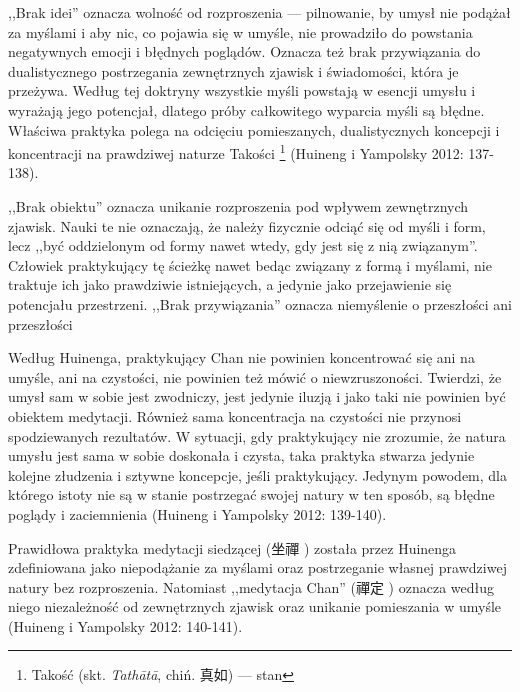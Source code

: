 ,,Brak idei'' oznacza wolność od rozproszenia --- pilnowanie, by umysł nie podążał za myślami i aby nic, co pojawia się w umyśle, nie prowadziło do powstania negatywnych emocji i błędnych poglądów. Oznacza też brak przywiązania do dualistycznego postrzegania zewnętrznych zjawisk i świadomości, która je przeżywa. Według tej doktryny wszystkie myśli powstają w esencji umysłu i wyrażają jego potencjał, dlatego próby całkowitego wyparcia myśli są błędne. Właściwa praktyka polega na odcięciu pomieszanych, dualistycznych koncepcji i koncentracji na prawdziwej naturze Takości%
\footnote{Takość (skt. \textit{Tathātā}, chiń. 真如) --- stan }
(Huineng i Yampolsky 2012: 137-138).

,,Brak obiektu'' oznacza unikanie rozproszenia pod wpływem zewnętrznych zjawisk. Nauki te nie oznaczają, że należy fizycznie odciąć się od myśli i form, lecz ,,być oddzielonym od formy nawet wtedy, gdy jest się z nią związanym''. Człowiek praktykujący tę ścieżkę nawet bedąc związany z formą i myślami, nie traktuje ich jako prawdziwie istniejących, a jedynie jako przejawienie się potencjału przestrzeni. ,,Brak przywiązania'' oznacza niemyślenie o przeszłości ani przeszłości\ibid

Według Huinenga, praktykujący Chan nie powinien koncentrować się ani na umyśle, ani na czystości, nie powinien też mówić o niewzruszoności. Twierdzi, że umysł sam w sobie jest zwodniczy, jest jedynie iluzją i jako taki nie powinien być obiektem medytacji. Również sama koncentracja na czystości nie przynosi spodziewanych rezultatów. W sytuacji, gdy praktykujący nie zrozumie, że natura umysłu jest sama w sobie doskonała i czysta, taka praktyka stwarza jedynie kolejne złudzenia i sztywne koncepcje, jeśli praktykujący. Jedynym powodem, dla którego istoty nie są w stanie postrzegać swojej natury w ten sposób, są błędne poglądy i zaciemnienia (Huineng i Yampolsky 2012: 139-140).

Prawidłowa praktyka medytacji siedzącej (坐禪 ) została przez Huinenga zdefiniowana jako niepodążanie za myślami oraz postrzeganie własnej prawdziwej natury bez rozproszenia. Natomiast ,,medytacja Chan'' (禪定 ) oznacza według niego niezależność od zewnętrznych zjawisk oraz unikanie pomieszania w umyśle (Huineng i Yampolsky 2012: 140-141).

